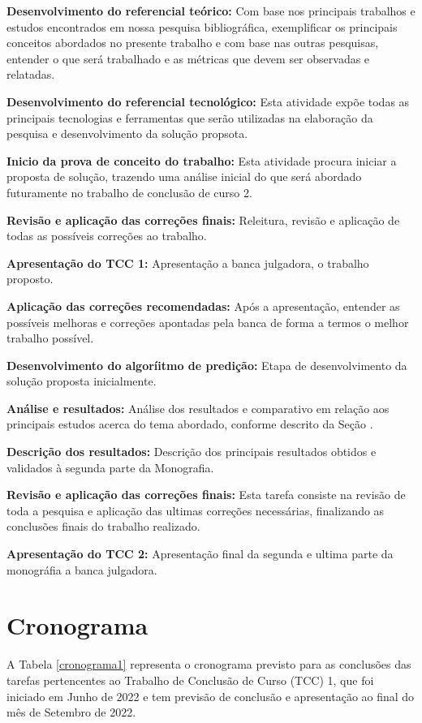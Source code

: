 \textbf{Desenvolvimento do referencial teórico:} Com base nos principais trabalhos e estudos encontrados em nossa pesquisa bibliográfica, exemplificar os principais conceitos abordados no presente trabalho e com base nas outras pesquisas, entender o que será trabalhado e as métricas que devem ser observadas e relatadas.

\textbf{Desenvolvimento do referencial tecnológico:} Esta atividade expõe todas as principais tecnologias e ferramentas que serão utilizadas na elaboração da pesquisa e desenvolvimento da solução propsota.

\textbf{Inicio da prova de conceito do trabalho:} Esta atividade procura iniciar a proposta de solução, trazendo uma análise inicial do que será abordado futuramente no trabalho de conclusão de curso 2.

\textbf{Revisão e aplicação das correções finais:} Releitura, revisão e aplicação de todas as possíveis correções ao trabalho.

\textbf{Apresentação do TCC 1:} Apresentação a banca julgadora, o trabalho proposto.

\textbf{Aplicação das correções recomendadas:} Após a apresentação, entender as possíveis melhoras e correções apontadas pela banca de forma a termos o melhor trabalho possível.

\textbf{Desenvolvimento do algoríitmo de predição:} Etapa de desenvolvimento da solução proposta inicialmente.

\textbf{Análise e resultados:} Análise dos resultados e comparativo em relação aos principais estudos acerca do tema abordado, conforme descrito da Seção .

\textbf{Descrição dos resultados:} Descrição dos principais resultados obtidos e validados à segunda parte da Monografia.

\textbf{Revisão e aplicação das correções finais:} Esta tarefa consiste na revisão de toda a pesquisa e aplicação das ultimas correções necessárias, finalizando as conclusões finais do trabalho realizado.

\textbf{Apresentação do TCC 2:} Apresentação final da segunda e ultima parte da monográfia a banca julgadora.

\section{Cronograma}
\label{crono}

A Tabela \ref{cronograma1} representa o cronograma previsto para as conclusões das tarefas pertencentes ao Trabalho de Conclusão de Curso (TCC) 1, que foi iniciado em Junho de 2022 e tem previsão de conclusão e apresentação ao final do mês de Setembro de 2022. 

